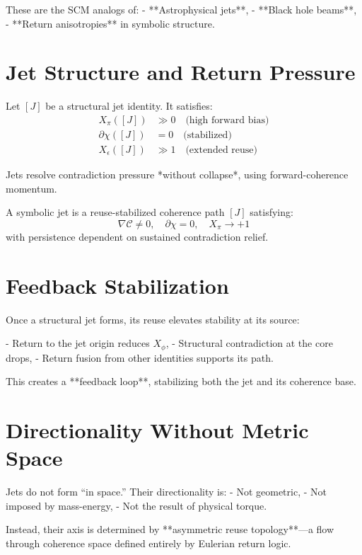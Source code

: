 These are the SCM analogs of:
- **Astrophysical jets**,
- **Black hole beams**,
- **Return anisotropies** in symbolic structure.

\section{Jet Structure and Return Pressure}

Let $[J]$ be a structural jet identity. It satisfies:
\[
\begin{aligned}
X_\pi([J]) &\gg 0 \quad \text{(high forward bias)} \\
\partial \chi([J]) &= 0 \quad \text{(stabilized)} \\
X_\epsilon([J]) &\gg 1 \quad \text{(extended reuse)}
\end{aligned}
\]

Jets resolve contradiction pressure *without collapse*, using forward-coherence momentum.

\begin{definition}
A symbolic jet is a reuse-stabilized coherence path $[J]$ satisfying:
\[
\nabla \mathcal{C} \ne 0,\quad \partial \chi = 0,\quad X_\pi \to +1
\]
with persistence dependent on sustained contradiction relief.
\end{definition}

\section{Feedback Stabilization}

Once a structural jet forms, its reuse elevates stability at its source:

- Return to the jet origin reduces $X_\phi$,
- Structural contradiction at the core drops,
- Return fusion from other identities supports its path.

This creates a **feedback loop**, stabilizing both the jet and its coherence base.

\section{Directionality Without Metric Space}

Jets do not form “in space.” Their directionality is:
- Not geometric,
- Not imposed by mass-energy,
- Not the result of physical torque.

Instead, their axis is determined by **asymmetric reuse topology**—a flow through coherence space defined entirely by Eulerian return logic.

